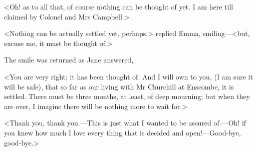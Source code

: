 <Oh! as to all that, of course nothing can be thought of yet. I am here till claimed by Colonel and Mrs Campbell.>

<Nothing can be actually settled yet, perhaps,> replied Emma, smiling—<but, excuse me, it must be thought of.>

The smile was returned as Jane answered,

<You are very right; it has been thought of. And I will own to you, (I am sure it will be safe), that so far as our living with Mr Churchill at Enscombe, it is settled. There must be three months, at least, of deep mourning; but when they are over, I imagine there will be nothing more to wait for.>

<Thank you, thank you.—This is just what I wanted to be assured of.—Oh! if you knew how much I love every thing that is decided and open!—Good-bye, good-bye.>